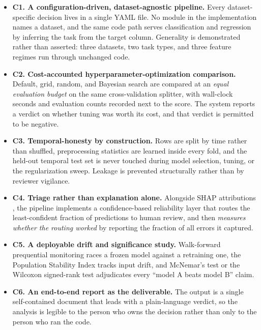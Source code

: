 \documentclass{ieeeaccess}
\begin{document}
\begin{itemize}
\item \textbf{C1. A configuration-driven, dataset-agnostic pipeline.} Every dataset-specific decision lives in a single YAML file. No module in the implementation names a dataset, and the same code path serves classification and regression by inferring the task from the target column. Generality is demonstrated rather than asserted: three datasets, two task types, and three feature regimes run through unchanged code.
\item \textbf{C2. Cost-accounted hyperparameter-optimization comparison.} Default, grid, random, and Bayesian search are compared at an \emph{equal evaluation budget} on the same cross-validation splitter, with wall-clock seconds and evaluation counts recorded next to the score. The system reports a verdict on whether tuning was worth its cost, and that verdict is permitted to be negative.
\item \textbf{C3. Temporal-honesty by construction.} Rows are split by time rather than shuffled, preprocessing statistics are learned inside every fold, and the held-out temporal test set is never touched during model selection, tuning, or the regularization sweep. Leakage is prevented structurally rather than by reviewer vigilance.
\item \textbf{C4. Triage rather than explanation alone.} Alongside SHAP attributions \cite{lundberg2017unified}, the pipeline implements a confidence-based reliability layer that routes the least-confident fraction of predictions to human review, and then \emph{measures whether the routing worked} by reporting the fraction of all errors it captured.
\item \textbf{C5. A deployable drift and significance study.} Walk-forward prequential monitoring races a frozen model against a retraining one, the Population Stability Index tracks input drift, and McNemar's test \cite{mcnemar1947note} or the Wilcoxon signed-rank test \cite{wilcoxon1945individual} adjudicates every ``model A beats model B'' claim.
\item \textbf{C6. An end-to-end report as the deliverable.} The output is a single self-contained document that leads with a plain-language verdict, so the analysis is legible to the person who owns the decision rather than only to the person who ran the code.
\end{itemize}
\end{document}
